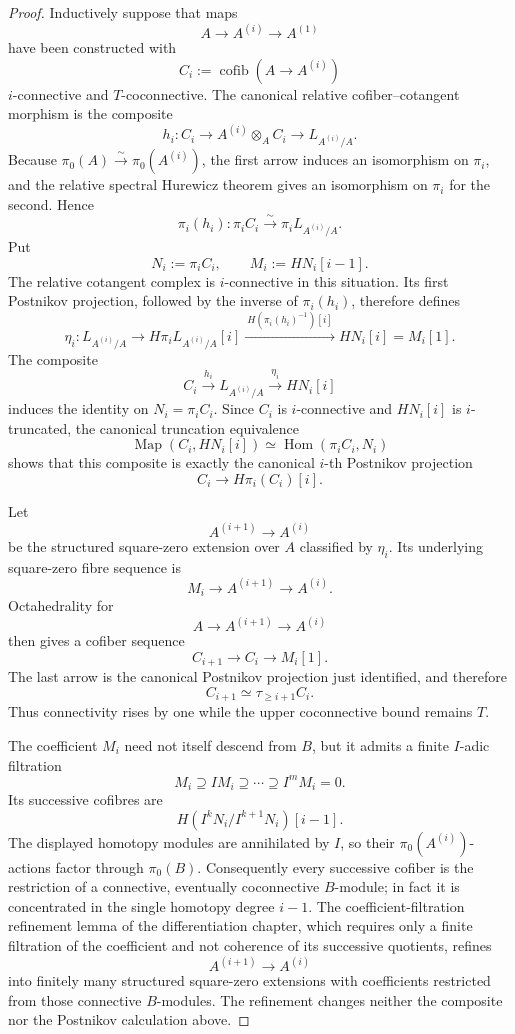 \begin{proof}
Inductively suppose that maps
\[
    A\longrightarrow A^{(i)}\longrightarrow A^{(1)}
\]
have been constructed with
\[
    C_i:=\operatorname{cofib}(A\to A^{(i)})
\]
$i$-connective and $T$-coconnective.  The canonical relative
cofiber--cotangent morphism is the composite
\[
    h_i:
    C_i
    \longrightarrow
    A^{(i)}\otimes_A C_i
    \longrightarrow
    L_{A^{(i)}/A}.
\]
Because $\pi_0(A)\xrightarrow{\sim}\pi_0(A^{(i)})$, the first arrow induces
an isomorphism on $\pi_i$, and the relative spectral Hurewicz theorem gives
an isomorphism on $\pi_i$ for the second.  Hence
\[
\boxed{
    \pi_i(h_i):\pi_iC_i\xrightarrow{\sim}\pi_iL_{A^{(i)}/A}.}
\]
Put
\[
    N_i:=\pi_iC_i,
    \qquad
    M_i:=HN_i[i-1].
\]
The relative cotangent complex is $i$-connective in this situation.  Its first
Postnikov projection, followed by the inverse of $\pi_i(h_i)$, therefore
defines
\[
    \eta_i:
    L_{A^{(i)}/A}
    \longrightarrow
    H\pi_iL_{A^{(i)}/A}[i]
    \xrightarrow{\ H(\pi_i(h_i)^{-1})[i]\ }
    HN_i[i]
    =
    M_i[1].
\]
The composite
\[
    C_i\xrightarrow{h_i}L_{A^{(i)}/A}
    \xrightarrow{\eta_i}HN_i[i]
\]
induces the identity on $N_i=\pi_iC_i$.  Since $C_i$ is $i$-connective and
$HN_i[i]$ is $i$-truncated, the canonical truncation equivalence
\[
    \operatorname{Map}(C_i,HN_i[i])
    \simeq
    \operatorname{Hom}(\pi_iC_i,N_i)
\]
shows that this composite is exactly the canonical $i$-th Postnikov
projection
\[
    C_i\longrightarrow H\pi_i(C_i)[i].
\]

Let
\[
    A^{(i+1)}\longrightarrow A^{(i)}
\]
be the structured square-zero extension over $A$ classified by $\eta_i$.
Its underlying square-zero fibre sequence is
\[
    M_i\longrightarrow A^{(i+1)}\longrightarrow A^{(i)}.
\]
Octahedrality for
\[
    A\longrightarrow A^{(i+1)}\longrightarrow A^{(i)}
\]
then gives a cofiber sequence
\[
    C_{i+1}\longrightarrow C_i\longrightarrow M_i[1].
\]
The last arrow is the canonical Postnikov projection just identified, and
therefore
\[
\boxed{
    C_{i+1}
    \simeq
    \tau_{\geq i+1}C_i.}
\]
Thus connectivity rises by one while the upper coconnective bound remains
$T$.

The coefficient $M_i$ need not itself descend from $B$, but it admits a
finite $I$-adic filtration
\[
    M_i\supseteq IM_i\supseteq\cdots\supseteq I^mM_i=0.
\]
Its successive cofibres are
\[
    H(I^kN_i/I^{k+1}N_i)[i-1].
\]
The displayed homotopy modules are annihilated by $I$, so their
$\pi_0(A^{(i)})$-actions factor through $\pi_0(B)$.  Consequently every
successive cofiber is the restriction of a connective, eventually
coconnective $B$-module; in fact it is concentrated in the single homotopy
degree $i-1$.  The coefficient-filtration refinement lemma of the differentiation chapter,
which requires only a finite filtration of the coefficient and not coherence
of its successive quotients, refines
\[
    A^{(i+1)}\to A^{(i)}
\]
into finitely many structured square-zero extensions with coefficients
restricted from those connective $B$-modules.  The refinement changes neither
the composite nor the Postnikov calculation above.


\end{proof}
